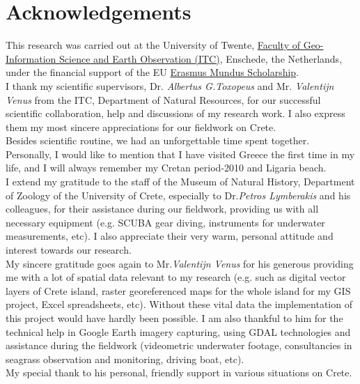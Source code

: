 \documentclass[11pt]{article}
\begin{document}
\section*{Acknowledgements}

This research was carried out at the University of Twente, \href{http://www.itc.nl/}{Faculty of Geo-Information Science and Earth Observation (ITC)}, Enschede, the Netherlands, under the financial support of the EU \href{http://ec.europa.eu/education/external-relation-programmes/doc72_en.htm}{Erasmus Mundus Scholarship}. 
\vspace{1mm}\\
I thank my scientific supervisors, Dr. \textit{Albertus G.Toxopeus}  and Mr. \textit{Valentijn Venus} from the ITC, Department of Natural Resources, for our successful scientific collaboration, help and discussions of my research work. 
I also express them my most sincere appreciations for our fieldwork on Crete. \\ Besides scientific routine, we had an unforgettable time spent together. \\ Personally, I would like to mention that I have visited Greece the first time in my life, and I will always remember my Cretan period-2010 and Ligaria beach.\vspace{1mm}\\
I extend my gratitude to the staff of the Museum of Natural History, Department of Zoology of the University of Crete, especially to Dr.\textit{Petros Lymberakis} and his colleagues, for their assistance during our fieldwork, providing us with all necessary equipment (e.g. SCUBA gear diving, instruments for underwater measurements, etc). I also appreciate their very warm, personal attitude and interest towards our research. 
\vspace{1mm}\\
My sincere gratitude goes again to Mr.\textit{Valentijn Venus} for his generous providing me with a lot of spatial data   relevant to my research (e.g. such as digital vector layers of Crete island, raster georeferenced maps for the whole island for my GIS project, Excel spreadsheets, etc). Without these vital data the implementation of this project would have hardly been possible. I am also thankful to him for the technical help in Google Earth imagery capturing, using GDAL technologies and assistance during the fieldwork (videometric underwater footage, consultancies in seagrass observation and monitoring, driving boat, etc). \\ My special thank to his personal, friendly support in various situations on Crete.\vspace{1mm}\\
\end{document}
